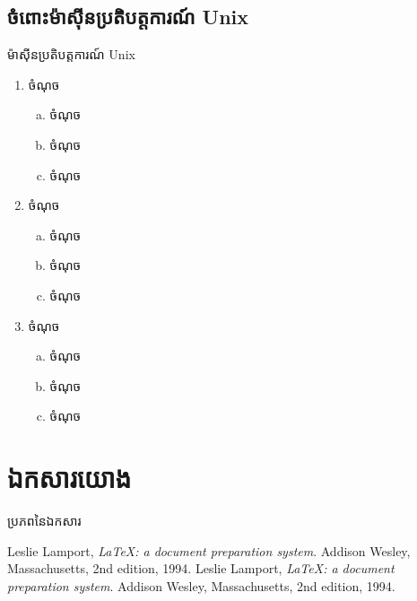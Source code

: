 \documentclass{beamer}
\begin{document}
	\subsection{ចំពោះម៉ាស៊ីនប្រតិបត្តការណ៍ Unix}
		\begin{frame}{ម៉ាស៊ីនប្រតិបត្តការណ៍ Unix}
			\begin{enumerate}
				\item ចំណុច
			\begin{enumerate}[a)]
				\item ចំណុច
				\item ចំណុច
				\item ចំណុច
			\end{enumerate}
			\item ចំណុច
			\begin{enumerate}[a)]
				\item ចំណុច
				\item ចំណុច
				\item ចំណុច
			\end{enumerate}
			\item ចំណុច
			\begin{enumerate}[a)]
				\item ចំណុច
				\item ចំណុច
				\item ចំណុច
			\end{enumerate}
		\end{enumerate}
	\end{frame}
	\section{ឯកសារយោង}
	\begin{frame}{ប្រភពនៃឯកសារ}
		\begin{thebibliography}{4}
			Leslie Lamport,
			\emph{\LaTeX: a document preparation system}.
			Addison Wesley, Massachusetts,
			2nd edition,
			1994.
			Leslie Lamport,
			\emph{\LaTeX: a document preparation system}.
			Addison Wesley, Massachusetts,
			2nd edition,
			1994.
		\end{thebibliography}
	\end{frame}
\end{document}
